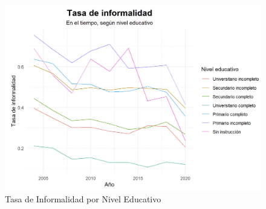 \documentclass[a4paper]{article}
\theoremstyle{plain}
\theoremstyle{definition}
\begin{document}
\begin{figure}[h]
    \centering
    \includegraphics[scale=0.5]{figuras/tasa de informalidad por nivel educativo.png}
    \caption{Tasa de Informalidad por Nivel Educativo}
    \label{fig:my_label}
\end{figure}

\newpage
\end{document}
